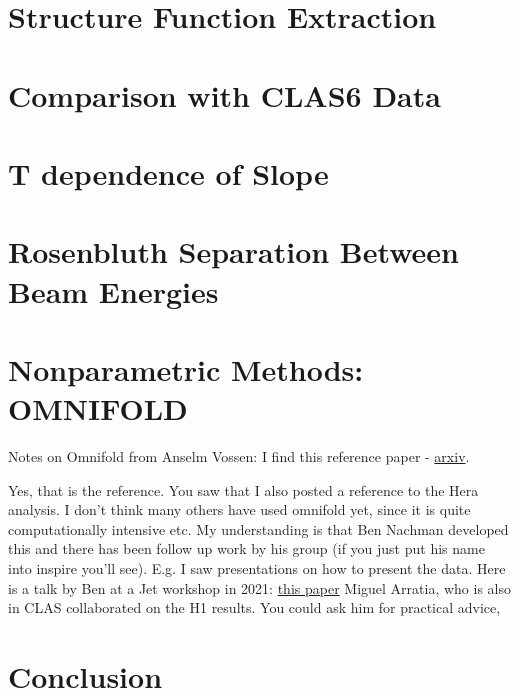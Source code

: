\section{Structure Function Extraction}
\section{Comparison with CLAS6 Data}
\section{T dependence of Slope}





\section{Rosenbluth Separation Between Beam Energies}
\section{Nonparametric Methods: OMNIFOLD}
Notes on Omnifold from Anselm Vossen:
I find this reference paper - \href{https://arxiv.org/pdf/1911.09107.pdf}{arxiv}.




Yes, that is the reference. You saw that I also posted a reference to the Hera analysis. I don’t think many others have used omnifold yet, since it is quite computationally intensive etc.
My understanding is that Ben Nachman developed this and there has been follow up work by his group (if you just put his name into inspire you’ll see). E.g. I saw presentations on how to present the data. Here is a talk by Ben at a Jet workshop in 2021: \href{https://indico.bnl.gov/event/10555/contributions/54721/attachments/37368/61570/H1Measurement_EICWorkshopSeptember2021.pdf}{this paper}
 Miguel Arratia, who is also in CLAS collaborated on the H1 results. You could ask him for practical advice,




\section{Conclusion}
